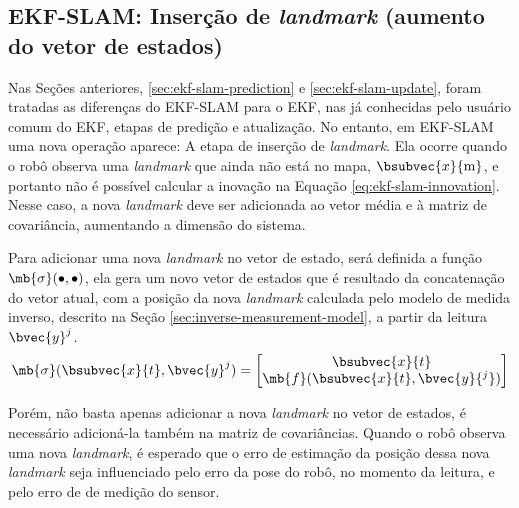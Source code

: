 \subsection{EKF-SLAM: Inserção de \textit{landmark} (aumento do vetor de estados)}
\label{sec:ekf-slam-landmark-insertion}
Nas Seções anteriores, \ref{sec:ekf-slam-prediction} e \ref{sec:ekf-slam-update}, foram tratadas as diferenças 
do EKF-SLAM para o EKF, nas já conhecidas pelo usuário comum do EKF, etapas de predição e atualização. No entanto, em EKF-SLAM uma nova operação aparece: A etapa de inserção de \textit{landmark}. Ela ocorre quando o robô observa uma \textit{landmark} que ainda não está no mapa, $\bsubvec{x}{\mathrm{m}}$, e portanto não é possível calcular a inovação na Equação \ref{eq:ekf-slam-innovation}. Nesse caso, a nova \textit{landmark} deve ser adicionada ao vetor média e à matriz de covariância, aumentando a dimensão do sistema.

Para adicionar uma nova \textit{landmark} no vetor de estado, será definida 
a função $\mb{\sigma}(\bullet, \bullet)$, ela gera um novo vetor de estados 
que é resultado da concatenação do vetor atual, com a posição da nova 
\textit{landmark} calculada pelo modelo de medida inverso, descrito na Seção \ref{sec:inverse-measurement-model}, a partir da leitura $\bvec{y}^j$.
\begin{equation}
      \mb{\sigma}(\bsubvec{x}{t}, \bvec{y}^j) = \begin{bmatrix}
        \bsubvec{x}{t} \\
        \mb{f}(\bsubvec{x}{t}, \bvec{y}{^j})
      \end{bmatrix}
\end{equation}

Porém, não basta apenas adicionar a nova \textit{landmark} no vetor de estados, é necessário adicioná-la também na matriz de covariâncias. Quando 
o robô observa uma nova \textit{landmark}, é esperado que o erro de estimação 
da posição dessa nova \textit{landmark} seja influenciado pelo erro da 
pose do robô, no momento da leitura, e pelo erro de de medição do sensor. 

